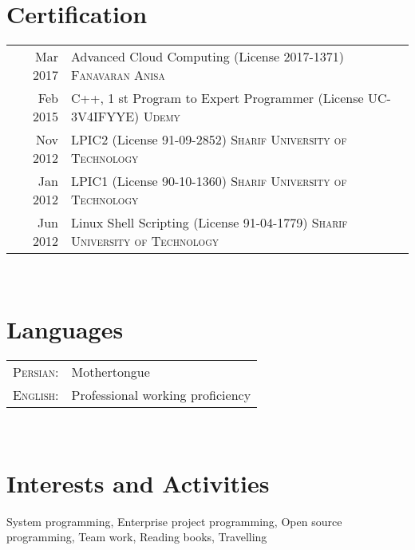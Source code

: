 \documentclass[a4paper,11pt]{article}
\begin{document}
\section{Certification}
\begin{tabular}{rp{12cm}}

    \textsc{} Mar 2017 & Advanced Cloud Computing (License 2017-1371) \textsc{Fanavaran Anisa}\\
    \textsc{} Feb 2015 & C++, 1 st Program to Expert Programmer (License UC-3V4IFYYE) \textsc{Udemy}\\
    \textsc{} Nov 2012 & LPIC2 (License 91-09-2852) \textsc{Sharif University of Technology}\\
    \textsc{} Jan 2012 & LPIC1 (License 90-10-1360) \textsc{Sharif University of Technology}\\
    \textsc{} Jun 2012 & Linux Shell Scripting (License 91-04-1779) \textsc{Sharif University of Technology}\\

\end{tabular}\\

\section{Languages}
\begin{tabular}{rl}

    \textsc{Persian:} & Mothertongue\\
    \textsc{English:} & Professional working proficiency\\

\end{tabular}\\

\section{Interests and Activities}

    System programming,
    Enterprise project programming,
    Open source programming,
    Team work,
    Reading books,
    Travelling
\end{document}
